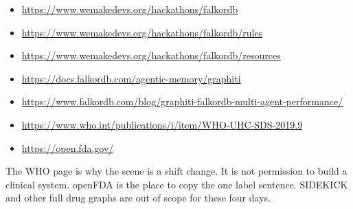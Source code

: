 \documentclass[11pt,a4paper]{article}
\begin{document}
\begin{itemize}
  \item \url{https://www.wemakedevs.org/hackathons/falkordb}
  \item \url{https://www.wemakedevs.org/hackathons/falkordb/rules}
  \item \url{https://www.wemakedevs.org/hackathons/falkordb/resources}
  \item \url{https://docs.falkordb.com/agentic-memory/graphiti}
  \item \url{https://www.falkordb.com/blog/graphiti-falkordb-multi-agent-performance/}
  \item \url{https://www.who.int/publications/i/item/WHO-UHC-SDS-2019.9}
  \item \url{https://open.fda.gov/}
\end{itemize}

The WHO page is why the scene is a shift change. It is not permission to build a clinical system.
openFDA is the place to copy the one label sentence. SIDEKICK and other full drug graphs are out of scope for these four days.
\end{document}

